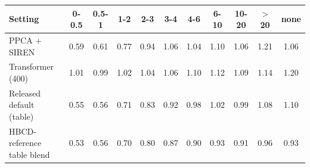 \begin{tabular}{lcccccccccc}
\toprule
Setting & 0-0.5 & 0.5-1 & 1-2 & 2-3 & 3-4 & 4-6 & 6-10 & 10-20 & $>$20 & none \\
\midrule
PPCA + SIREN & 0.59 & 0.61 & 0.77 & 0.94 & 1.06 & 1.04 & 1.10 & 1.06 & 1.21 & 1.06 \\
Transformer (400) & 1.01 & 0.99 & 1.02 & 1.04 & 1.06 & 1.10 & 1.12 & 1.09 & 1.14 & 1.20 \\
Released default (table) & 0.55 & 0.56 & 0.71 & 0.83 & 0.92 & 0.98 & 1.02 & 0.99 & 1.08 & 1.10 \\
HBCD-reference table blend & 0.53 & 0.56 & 0.70 & 0.80 & 0.87 & 0.90 & 0.93 & 0.91 & 0.96 & 0.93 \\
\bottomrule
\end{tabular}
